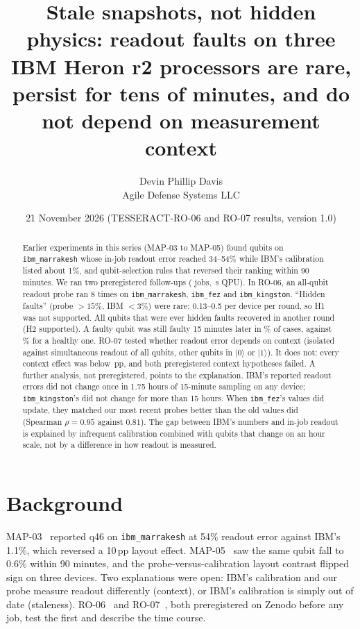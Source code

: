 \documentclass[10pt,twocolumn]{article}
\title{\bfseries Stale snapshots, not hidden physics: readout faults on three IBM Heron r2 processors
are rare, persist for tens of minutes, and do not depend on measurement context}
\author{Devin Phillip Davis\\ \small Agile Defense Systems LLC}
\date{21 November 2026 \quad (TESSERACT-RO-06 and RO-07 results, version 1.0)}
\begin{document}
\maketitle

\begin{abstract}
\noindent
Earlier experiments in this series (MAP-03 to MAP-05) found qubits on \texttt{ibm\_marrakesh} whose
in-job readout error reached 34--54\% while IBM's calibration listed about 1\%, and qubit-selection
rules that reversed their ranking within 90 minutes. We ran two preregistered follow-ups
(\NJobs{} jobs, \TotalSeconds{}\,s QPU). In RO-06, an all-qubit readout probe ran 8 times on
\texttt{ibm\_marrakesh}, \texttt{ibm\_fez} and \texttt{ibm\_kingston}. ``Hidden faults'' (probe
$>15\%$, IBM $<3\%$) were rare: 0.13--0.5 per device per round, so H1 was not supported. All
\HTwoEver{} qubits that were ever hidden faults recovered in another round (H2 supported). A faulty
qubit was still faulty 15 minutes later in \HThreeFF\% of cases, against \HThreeOF\% for a healthy
one. RO-07 tested whether readout error depends on context (isolated against simultaneous readout of
all qubits, other qubits in $|0\rangle$ or $|1\rangle$). It does not: every context effect was below
\MaxD\,pp, and both preregistered context hypotheses failed. A further analysis, not preregistered,
points to the explanation. IBM's reported readout errors did not change once in 1.75 hours of
15-minute sampling on any device; \texttt{ibm\_kingston}'s did not change for more than 15 hours.
When \texttt{ibm\_fez}'s values did update, they matched our most recent probes better than the old
values did (Spearman $\rho=0.95$ against $0.81$). The gap between IBM's numbers and in-job readout is
explained by infrequent calibration combined with qubits that change on an hour scale, not by a
difference in how readout is measured.
\end{abstract}

\section{Background}
MAP-03~\cite{map03} reported q46 on \texttt{ibm\_marrakesh} at 54\% readout error against IBM's 1.1\%,
which reversed a 10\,pp layout effect. MAP-05~\cite{map05} saw the same qubit fall to 0.6\% within 90
minutes, and the probe-versus-calibration layout contrast flipped sign on three devices. Two
explanations were open: IBM's calibration and our probe measure readout differently (context), or
IBM's calibration is simply out of date (staleness). RO-06~\cite{pre6} and RO-07~\cite{pre7}, both
preregistered on Zenodo before any job, test the first and describe the time course.
\end{document}
